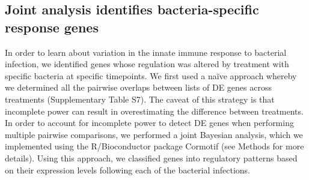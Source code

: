 \subsection{Joint analysis identifies bacteria-specific response
genes}\label{joint-analysis-identifies-bacteria-specific-response-genes}

In order to learn about variation in the innate immune response to
bacterial infection, we identified genes whose regulation was altered by
treatment with specific bacteria at specific timepoints. We first used a
naïve approach whereby we determined all the pairwise overlaps between
lists of DE genes across treatments (Supplementary Table S7). The caveat
of this strategy is that incomplete power can result in overestimating
the difference between treatments. In order to account for incomplete
power to detect DE genes when performing multiple pairwise comparisons,
we performed a joint Bayesian analysis, which we implemented using the
R/Bioconductor package Cormotif \citep{Wei2015} (see Methods for more
details). Using this approach, we classified genes into regulatory
patterns based on their expression levels following each of the
bacterial infections.

